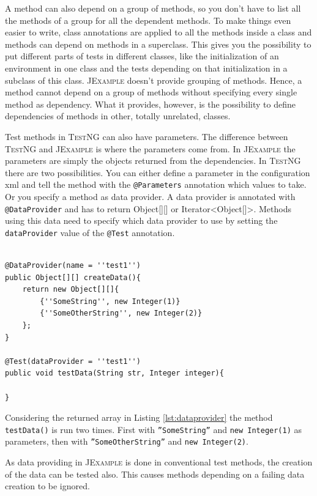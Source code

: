 \documentclass[11pt]{article}
\makeatletter
\newcommand{\JExample}{\textsc{JExample}\xspace}
\newcommand{\TestNG}{\textsc{TestNG}\xspace}
\newcommand{\ttt}[1]{\texttt{#1}}
\newcommand{\attest}{\ttt{@Test}\xspace}
\makeatother
\begin{document}
A method can also depend on a group of methods, so you don't have to list all the methods of a group for all the dependent methods. To make things even easier to write, class annotations are applied to all the methods inside a class and methods can depend on methods in a superclass. This gives you the possibility to put different parts of tests in different classes, like the initialization of an environment in one class and the tests depending on that initialization in a subclass of this class. \JExample doesn't provide grouping of methods. Hence, a method cannot depend on a group of methods without specifying every single method as dependency. What it provides, however, is the possibility to define dependencies of methods in other, totally unrelated, classes.

Test methods in \TestNG can also have parameters. The difference between \TestNG and \JExample is where the parameters come from. In \JExample the parameters are simply the objects returned from the dependencies. In \TestNG there are two possibilities. You can either define a parameter in the configuration xml and tell the method with the \ttt{@Parameters} annotation which values to take. Or you specify a method as data provider. A data provider is annotated with \ttt{@DataProvider} and has to return Object[][] or Iterator<Object[]>. Methods using this data need to specify which data provider to use by setting the \ttt{dataProvider} value of the \attest annotation.

\begin{lstlisting}[label=lst:dataprovider,caption=Data providing in \TestNG with \ttt{@DataProvider}.]

@DataProvider(name = ''test1'')
public Object[][] createData(){
	return new Object[][]{
		{''SomeString'', new Integer(1)}
		{''SomeOtherString'', new Integer(2)}
	};
}

@Test(dataProvider = ''test1'')
public void testData(String str, Integer integer){

}

\end{lstlisting}

Considering the returned array in Listing \ref{lst:dataprovider} the method \ttt{testData()} is run two times. First with \ttt{''SomeString''} and \ttt{new Integer(1)} as parameters, then with \ttt{''SomeOtherString''} and \ttt{new Integer(2)}.

As data providing in \JExample is done in conventional test methods, the creation of the data can be tested also. This causes methods depending on a failing data creation to be ignored.\\
\end{document}
